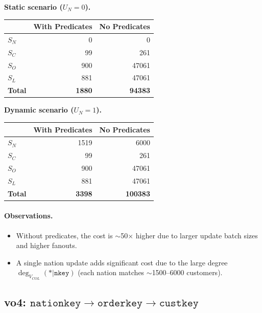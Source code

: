 \smallskip
\noindent\textbf{Static scenario ($U_N = 0$).}
\begin{center}
\begin{tabular}{lrr}
\toprule
& With Predicates & No Predicates \\
\midrule
$S_N$ & 0 & 0 \\
$S_C$ & 99 & 261 \\
$S_O$ & 900 & 47061 \\
$S_L$ & 881 & 47061 \\
\midrule
\textbf{Total} & \textbf{1880} & \textbf{94383} \\
\bottomrule
\end{tabular}
\end{center}

\smallskip
\noindent\textbf{Dynamic scenario ($U_N = 1$).}
\begin{center}
\begin{tabular}{lrr}
\toprule
& With Predicates & No Predicates \\
\midrule
$S_N$ & 1519 & 6000 \\
$S_C$ & 99 & 261 \\
$S_O$ & 900 & 47061 \\
$S_L$ & 881 & 47061 \\
\midrule
\textbf{Total} & \textbf{3398} & \textbf{100383} \\
\bottomrule
\end{tabular}
\end{center}

\paragraph{Observations.}
\begin{itemize}
\item Without predicates, the cost is $\sim$50$\times$ higher due to larger update batch sizes and higher fanouts.
\item A single nation update adds significant cost due to the large degree $\deg_{V_{COL}}(*|\texttt{nkey})$
(each nation matches $\sim$1500--6000 customers).
\end{itemize}

\subsection{vo4: $\texttt{nationkey} \rightarrow \texttt{orderkey} \rightarrow \texttt{custkey}$}

